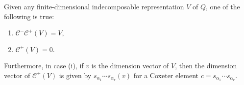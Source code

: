 Given any finite-dimensional indecomposable representation $V$ of $Q$, one
of the following is true:
\begin{enumerate}[label=(\roman*)]
	\item $\mathcal{C}^-\mathcal{C}^+(V) = V$,
	\item $\mathcal{C}^+(V) = 0$.
\end{enumerate}

Furthermore, in case (i), if $v$ is the dimension vector of  $V$, then  the
dimension vector of $\mathcal{C}^+(V)$ is given by
$s_{\alpha_1}\cdots s_{\alpha_r}(v)$ for a Coxeter element $c = s_{\alpha_1}\cdots s_{\alpha_r}$.
